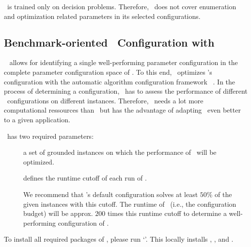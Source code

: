\begin{note}
\claspfolio\ is trained only on decision problems.
Therefore, \claspfolio\ does not cover enumeration and optimization related parameters in its selected configurations.
\end{note}


\subsection{Benchmark-oriented \clasp\ Configuration with \piclasp}
\label{sec:piclasp}

\piclasp\ %
allows for identifying a single well-performing parameter configuration 
in the complete parameter configuration space of \clasp.
To this end, \piclasp\ optimizes \clasp's configuration with the automatic algorithm configuration framework \smac~\cite{huhole11b}.
In the process of determining a configuration,
\piclasp\ has to assess the performance of different \clasp\ configurations on different instances. 
Therefore, \piclasp\ needs a lot more computational ressources than \claspfolio\
but has the advantage of adapting \clasp\ even better to a given application.
 
\piclasp\ has two required parameters:
%
\begin{description}
  \item[] a set of grounded instances on which the performance of \clasp\ will be optimized.
  \item[\code{--cutoff,-c}] defines the runtime cutoff of each run of \clasp. 

  		We recommend that \clasp's default configuration solves at least $50\%$ of the given instances with this cutoff.
  		The runtime of \piclasp\ (i.e., the configuration budget) will be approx. $200$ times this runtime cutoff 
  		to determine a well-performing configuration of \clasp.
\end{description} 

To install all required packages of \piclasp, please run `'.
This locally installs \clasp, \smac, \sysfont{runsolver} and \claspre.

